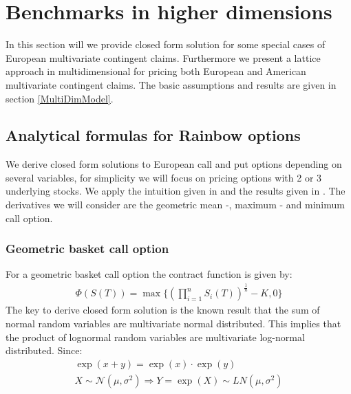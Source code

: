 
\section{Benchmarks in higher dimensions}\label{BMHiggerDim}
In this section will we provide closed form solution for some special cases of European multivariate contingent claims. Furthermore we present a lattice approach in multidimensional for pricing both European and American multivariate contingent claims. The basic assumptions and results are given in section \ref{MultiDimModel}.

\subsection{Analytical formulas for Rainbow options}
We derive closed form solutions to European call and put options depending on several variables, for simplicity we will focus on pricing options with 2 or 3 underlying stocks. We apply the intuition given in \parencite{Johnson87} and the results given in \parencite{Ouwehand2006}. The derivatives we will consider are the geometric mean -, maximum - and minimum call option.

\subsubsection{Geometric basket call option}
For a geometric basket call option the contract function is given by:
\begin{align*}
\Phi(S(T))=\max\{ (\prod_{i=1}^{n} S_i(T))^{\frac{1}{n}}-K,0 \}
\end{align*}
The key to derive closed form solution is the known result that the sum of normal random variables are multivariate normal distributed.
This implies that the product of lognormal random variables are multivariate log-normal distributed. Since: 
\begin{equation*}
\begin{split}
\exp(x+y)=\exp(x)\cdot \exp(y) \\
X \sim \mathcal{N}(\mu,\sigma^2) \Rightarrow Y = \exp(X)\sim LN(\mu, \sigma^2)
\end{split}
\end{equation*}

